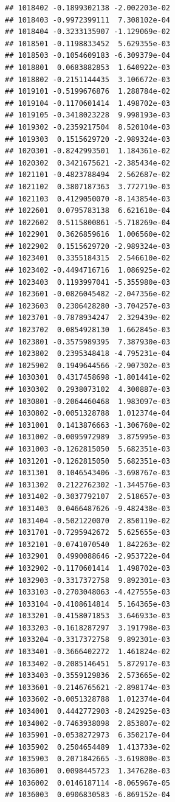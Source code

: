 \begin{frame}[fragile]
\begin{verbatim}
## 1018402 -0.1899302138 -2.002203e-02
## 1018403 -0.9972399111  7.308102e-04
## 1018404 -0.3233135907 -1.129069e-02
## 1018501 -0.1198833452  5.629355e-03
## 1018503 -0.1054609183 -6.309379e-04
## 1018801  0.0683882853  1.640922e-03
## 1018802 -0.2151144435  3.106672e-03
## 1019101 -0.5199676876  1.288784e-02
## 1019104 -0.1170601414  1.498702e-03
## 1019105 -0.3418023228  9.998193e-03
## 1019302 -0.2359217504  8.520104e-03
## 1019303  0.1515629720 -2.989324e-03
## 1020301 -0.8242993501  1.184361e-02
## 1020302  0.3421675621 -2.385434e-02
## 1021101 -0.4823788494  2.562687e-02
## 1021102  0.3807187363  3.772719e-03
## 1021103  0.4129050070 -8.143854e-03
## 1022601  0.0795783138  6.621610e-04
## 1022602  0.5115800861 -5.718269e-04
## 1022901  0.3626859616  1.006560e-02
## 1022902  0.1515629720 -2.989324e-03
## 1023401  0.3355184315  2.546610e-02
## 1023402 -0.4494716716  1.086925e-02
## 1023403  0.1193997041 -5.355980e-03
## 1023601 -0.0826045482 -2.047356e-02
## 1023603  0.2306428280 -3.704257e-03
## 1023701 -0.7878934247  2.329439e-02
## 1023702  0.0854928130  1.662845e-03
## 1023801 -0.3575989395  7.387930e-03
## 1023802  0.2395348418 -4.795231e-04
## 1025902  0.1949644566 -2.907302e-03
## 1030301  0.4317458698 -1.801441e-02
## 1030302  0.2938073102  4.300887e-03
## 1030801 -0.2064460468  1.983097e-03
## 1030802 -0.0051328788  1.012374e-04
## 1031001  0.1413876663 -1.306760e-02
## 1031002 -0.0095972989  3.875995e-03
## 1031003 -0.1262815050  5.682351e-03
## 1031201 -0.1262815050  5.682351e-03
## 1031301  0.1046543406 -3.698767e-03
## 1031302  0.2122762302 -1.344576e-03
## 1031402 -0.3037792107  2.518657e-03
## 1031403  0.0466487626 -9.482438e-03
## 1031404 -0.5021220070  2.850119e-02
## 1031701 -0.7295942672  5.625655e-03
## 1032101 -0.0741070540  1.842263e-02
## 1032901  0.4990088646 -2.953722e-04
## 1032902 -0.1170601414  1.498702e-03
## 1032903 -0.3317372758  9.892301e-03
## 1033103 -0.2703048063 -4.427555e-03
## 1033104 -0.4108614814  5.164365e-03
## 1033201 -0.4158071853  3.646933e-03
## 1033203 -0.1618287297  3.191798e-03
## 1033204 -0.3317372758  9.892301e-03
## 1033401 -0.3666402272  1.461824e-02
## 1033402 -0.2085146451  5.872917e-03
## 1033403 -0.3559129836  2.573665e-02
## 1033601 -0.2146765621 -2.898174e-03
## 1033602 -0.0051328788  1.012374e-04
## 1034001  0.4442772903 -8.242925e-03
## 1034002 -0.7463938098  2.853807e-02
## 1035901 -0.0538272973  6.350217e-04
## 1035902  0.2504654489  1.413733e-02
## 1035903  0.2071842665 -3.619800e-03
## 1036001  0.0098445723  1.347628e-03
## 1036002  0.0146187114 -8.065967e-05
## 1036003  0.0906830583 -6.869152e-04

\end{verbatim}
\end{frame}
